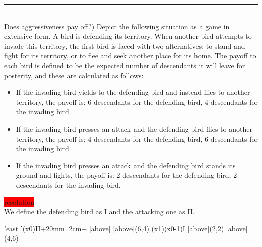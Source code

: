 \documentclass[10pt]{report}
\newenvironment{exercise}[1]
    {\vspace{0.5cm}\hrule\vspace{0.5cm}\noindent\fbox{#1}\\}
    {\vspace{0.5cm}}
\newenvironment{response}
{\vspace{0.2cm}\noindent\colorbox{red}{resolution}}
    {\vspace{0.5cm}}
\begin{document}
\begin{exercise}{3.3}
	(Does aggressiveness pay off?) Depict the following situation as a game in extensive form. A bird is defending its territory. When another bird attempts to invade this territory, the first bird is faced with two alternatives: to stand and fight for its territory, or to flee and seek another place for its home. The payoff to each bird is defined to be the expected number of descendants it will leave for posterity, and these are calculated as follows:
	\begin{itemize}
		\item  If the invading bird yields to the defending bird and instead flies to another territory, the payoff is: 6 descendants for the defending bird, 4 descendants for the invading bird.
		\item If the invading bird presses an attack and the defending bird flies to another territory, the payoff is: 4 descendants for the defending bird, 6 descendants for the invading bird.
		\item If the invading bird presses an attack and the defending bird stands its ground and fights, the payoff is: 2 descendants for the defending bird, 2 descendants for the invading bird.
	\end{itemize}

	\begin{response}\\
		We define the defending bird as I and the attacking one as II.

		\vspace{0.5cm}
		\begin{istgame}[sloped,font=\tiny]
			\setistgrowdirection'{east}
			\setistOvalNodeStyle{.6cm}
			\istrooto'(x0){II}+{20mm}..{2cm}+
			[above]
			[above]{(6,4)}
			\endist
			\xtShowEndPoints[oval node, minimum size=6pt]
			\xtdistance{20mm}{10mm}
			\istrooto(x1)(x0-1){I}
			[above]{(2,2)}
			[above]{(4,6)}
			\endist
			\endist
		\end{istgame}
	\end{response}
\end{exercise}
\end{document}
